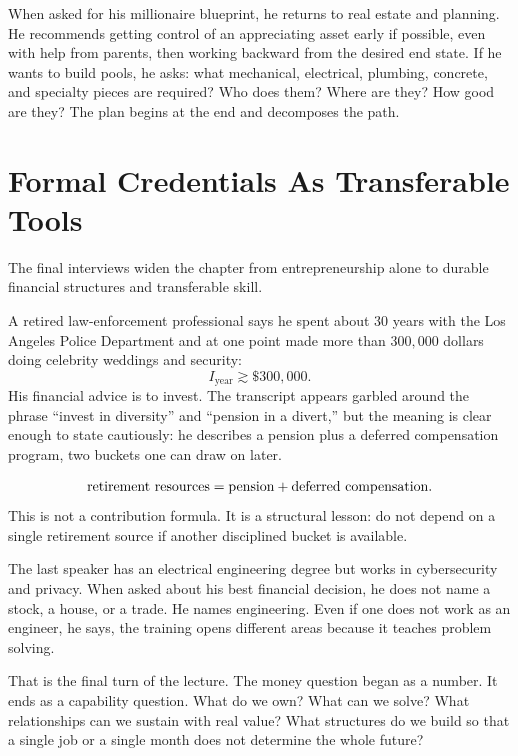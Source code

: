 When asked for his millionaire blueprint, he returns to real estate and planning. He recommends getting control of an appreciating asset early if possible, even with help from parents, then working backward from the desired end state. If he wants to build pools, he asks: what mechanical, electrical, plumbing, concrete, and specialty pieces are required? Who does them? Where are they? How good are they? The plan begins at the end and decomposes the path.

\section{Formal Credentials As Transferable Tools}

The final interviews widen the chapter from entrepreneurship alone to durable financial structures and transferable skill.

A retired law-enforcement professional says he spent about \(30\) years with the Los Angeles Police Department and at one point made more than \(300{,}000\) dollars doing celebrity weddings and security:
\begin{equation}
I_{\mathrm{year}} \gtrsim \$300{,}000.
\end{equation}
His financial advice is to invest. The transcript appears garbled around the phrase ``invest in diversity'' and ``pension in a divert,'' but the meaning is clear enough to state cautiously: he describes a pension plus a deferred compensation program, two buckets one can draw on later.

\begin{equation}
\hbox{retirement resources}
  =
  \hbox{pension}
  +
  \hbox{deferred compensation}.
\end{equation}
This is not a contribution formula. It is a structural lesson: do not depend on a single retirement source if another disciplined bucket is available.

The last speaker has an electrical engineering degree but works in cybersecurity and privacy. When asked about his best financial decision, he does not name a stock, a house, or a trade. He names engineering. Even if one does not work as an engineer, he says, the training opens different areas because it teaches problem solving.

That is the final turn of the lecture. The money question began as a number. It ends as a capability question. What do we own? What can we solve? What relationships can we sustain with real value? What structures do we build so that a single job or a single month does not determine the whole future?

